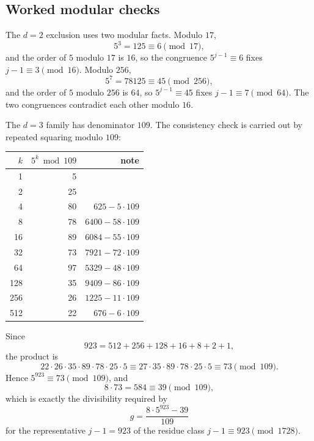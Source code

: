 \subsection{Worked modular checks}

The $d=2$ exclusion uses two modular facts.  Modulo $17$,
\begin{equation*}
  5^3=125\equiv6\pmod{17},
\end{equation*}
and the order of $5$ modulo $17$ is $16$, so the congruence
$5^{j-1}\equiv6$ fixes $j-1\equiv3\pmod{16}$.  Modulo $256$,
\begin{equation*}
  5^7=78125\equiv45\pmod{256},
\end{equation*}
and the order of $5$ modulo $256$ is $64$, so $5^{j-1}\equiv45$
fixes $j-1\equiv7\pmod{64}$.  The two congruences contradict each
other modulo $16$.

The $d=3$ family has denominator $109$.  The consistency check is
carried out by repeated squaring modulo $109$:
\begin{center}
\small
\begin{tabular}{@{}rrr@{}}
\toprule
$k$ & $5^k\bmod 109$ & note \\
\midrule
1 & 5 & \\
2 & 25 & \\
4 & 80 & $625-5\cdot109$ \\
8 & 78 & $6400-58\cdot109$ \\
16 & 89 & $6084-55\cdot109$ \\
32 & 73 & $7921-72\cdot109$ \\
64 & 97 & $5329-48\cdot109$ \\
128 & 35 & $9409-86\cdot109$ \\
256 & 26 & $1225-11\cdot109$ \\
512 & 22 & $676-6\cdot109$ \\
\bottomrule
\end{tabular}
\end{center}
Since
\begin{equation*}
  923=512+256+128+16+8+2+1,
\end{equation*}
the product is
\begin{equation*}
  22\cdot26\cdot35\cdot89\cdot78\cdot25\cdot5
  \equiv27\cdot35\cdot89\cdot78\cdot25\cdot5
  \equiv73\pmod{109}.
\end{equation*}
Hence $5^{923}\equiv73\pmod{109}$, and
\begin{equation*}
  8\cdot73=584\equiv39\pmod{109},
\end{equation*}
which is exactly the divisibility required by
\begin{equation*}
  g=\frac{8\cdot5^{923}-39}{109}
\end{equation*}
for the representative $j-1=923$ of the residue class
$j-1\equiv923\pmod{1728}$.

